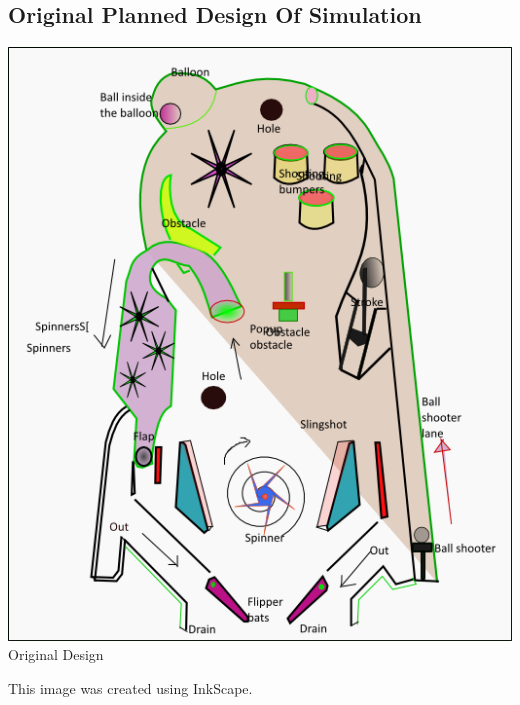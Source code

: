 \documentclass[11pt]{article}
\begin{document}
\subsection{Original Planned Design Of Simulation}
\begin{center}
\includegraphics[scale=0.5]{../plots/our.png}\\
Original Design
\end{center}
This image was created using InkScape.\\
\end{document}
